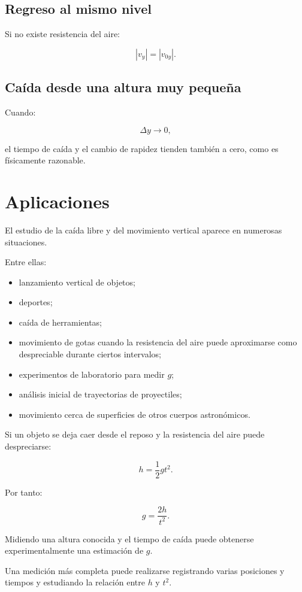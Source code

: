 \subsection{Regreso al mismo nivel}

Si no existe resistencia del aire:

\[ |v_y|=|v_{0y}|. \]


\subsection{Caída desde una altura muy pequeña}

Cuando:

\[ \Delta y\to0, \]

el tiempo de caída y el cambio de rapidez tienden también a cero, como es físicamente razonable.


\section{Aplicaciones}

El estudio de la caída libre y del movimiento vertical aparece en numerosas situaciones.

Entre ellas:

\begin{itemize}
    \item lanzamiento vertical de objetos;
    \item deportes;
    \item caída de herramientas;
    \item movimiento de gotas cuando la resistencia del aire puede aproximarse como despreciable durante ciertos intervalos;
    \item experimentos de laboratorio para medir \(g\);
    \item análisis inicial de trayectorias de proyectiles;
    \item movimiento cerca de superficies de otros cuerpos astronómicos.
\end{itemize}


\begin{aplicacion}
Si un objeto se deja caer desde el reposo y la resistencia del aire puede despreciarse:

\[ h=\frac{1}{2}gt^2. \]

Por tanto:

\[ g=\frac{2h}{t^2}. \]

Midiendo una altura conocida y el tiempo de caída puede obtenerse experimentalmente una estimación de \(g\).

Una medición más completa puede realizarse registrando varias posiciones y tiempos y estudiando la relación entre \(h\) y \(t^2\).
\end{aplicacion}


